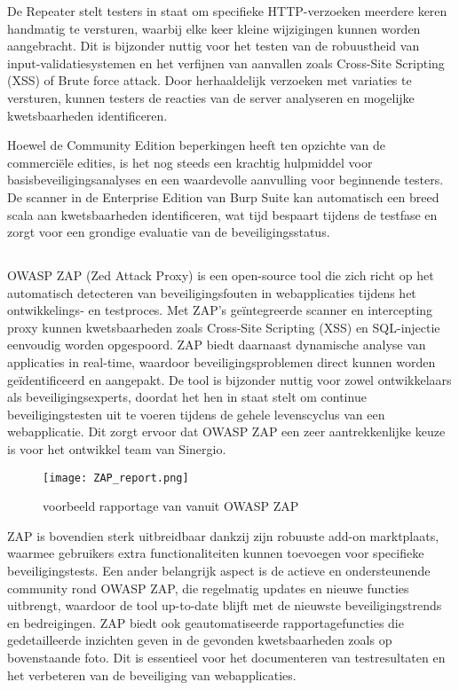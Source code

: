 De Repeater stelt testers in staat om specifieke HTTP-verzoeken meerdere keren handmatig te versturen, waarbij elke keer 
kleine wijzigingen kunnen worden aangebracht. Dit is bijzonder nuttig voor het testen van de robuustheid van 
input-validatiesystemen en het verfijnen van aanvallen zoals Cross-Site Scripting (XSS) of Brute force attack. Door 
herhaaldelijk verzoeken met variaties te versturen, kunnen testers de reacties van de server analyseren en mogelijke 
kwetsbaarheden identificeren.

Hoewel de Community Edition beperkingen heeft ten opzichte van de 
commerciële edities, is het nog steeds een krachtig hulpmiddel voor basisbeveiligingsanalyses en een waardevolle aanvulling 
voor beginnende testers. De scanner in de Enterprise Edition van Burp Suite kan automatisch een breed scala aan kwetsbaarheden 
identificeren, wat tijd bespaart tijdens de testfase en zorgt voor een grondige evaluatie van de beveiligingsstatus.

\subsection{}
OWASP ZAP (Zed Attack Proxy) is een open-source tool die zich richt op het automatisch detecteren van beveiligingsfouten in 
webapplicaties tijdens het ontwikkelings- en testproces. Met ZAP's geïntegreerde scanner en intercepting proxy kunnen 
kwetsbaarheden zoals Cross-Site Scripting (XSS) en SQL-injectie eenvoudig worden opgespoord. ZAP biedt 
daarnaast dynamische analyse van applicaties in real-time, waardoor beveiligingsproblemen direct kunnen worden geïdentificeerd 
en aangepakt. De tool is bijzonder nuttig voor zowel ontwikkelaars als beveiligingsexperts, doordat het hen in staat stelt 
om continue beveiligingstesten uit te voeren tijdens de gehele levenscyclus van een webapplicatie. Dit zorgt ervoor dat 
OWASP ZAP een zeer aantrekkenlijke keuze is voor het ontwikkel team van Sinergio.
\begin{figure}
    \centering
    \texttt{[image: ZAP\_report.png]}
    \caption[voorbeeld rapportage van vanuit OWASP ZAP]{voorbeeld rapportage van vanuit OWASP ZAP}
\end{figure}
ZAP is bovendien sterk uitbreidbaar dankzij zijn robuuste add-on marktplaats, waarmee gebruikers extra functionaliteiten 
kunnen toevoegen voor specifieke beveiligingstests. Een ander belangrijk aspect is de actieve en ondersteunende community 
rond OWASP ZAP, die regelmatig updates en nieuwe functies uitbrengt, waardoor de tool up-to-date blijft met de nieuwste 
beveiligingstrends en bedreigingen. ZAP biedt ook geautomatiseerde rapportagefuncties die gedetailleerde inzichten geven 
in de gevonden kwetsbaarheden zoals op bovenstaande foto. Dit is essentieel voor het documenteren van testresultaten en het verbeteren van de beveiliging 
van webapplicaties. 

